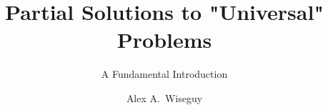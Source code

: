 \documentclass[type=master,degree=engineering,theme=default,language=english,titlelanguage=english,smartquotes=true,aiusage=detailed]{hgbthesis}
\begin{document}


\title{Partial Solutions to "Universal" Problems}
\subtitle{A Fundamental Introduction}
\author{Alex A.\ Wiseguy}







\frontmatter                                   %

\maketitle
\tableofcontents

		
			

\mainmatter                                    %









\end{document}
